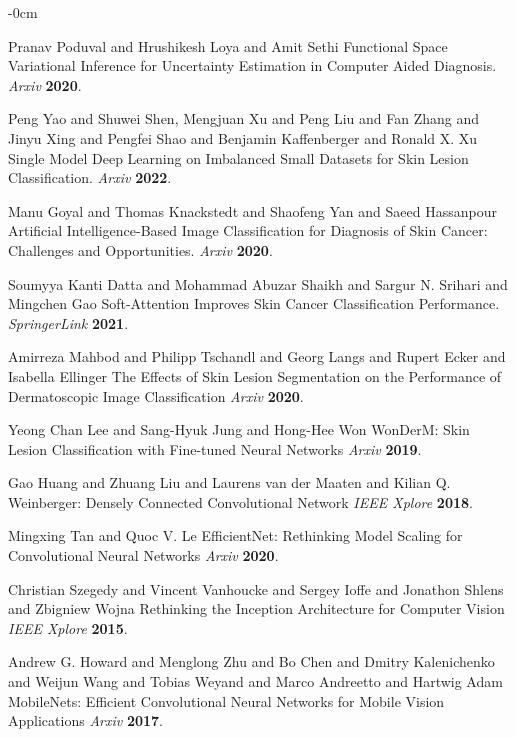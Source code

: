 \documentclass[sensors,article,submit,pdftex,moreauthors]{Definitions/mdpi}
\begin{document}
\begin{adjustwidth}{-\extralength}{0cm}
\begin{thebibliography}{999}
Pranav Poduval and Hrushikesh Loya and Amit Sethi Functional Space Variational Inference for Uncertainty Estimation in Computer Aided Diagnosis. 
{\em Arxiv} 
{\bf 2020}.

Peng Yao and Shuwei Shen, Mengjuan Xu and Peng Liu and Fan Zhang and Jinyu Xing and Pengfei Shao and Benjamin Kaffenberger and Ronald X. Xu Single Model Deep Learning on Imbalanced Small Datasets for Skin Lesion Classification. 
{\em Arxiv} 
{\bf 2022}.

Manu Goyal and Thomas Knackstedt and Shaofeng Yan and Saeed Hassanpour Artificial Intelligence-Based Image Classification for Diagnosis of Skin Cancer: Challenges and Opportunities. 
{\em Arxiv} 
{\bf 2020}.

Soumyya Kanti Datta and  Mohammad Abuzar Shaikh and Sargur N. Srihari and Mingchen Gao Soft-Attention Improves Skin Cancer Classification Performance. {\em SpringerLink} 
{\bf 2021}.

Amirreza Mahbod and Philipp Tschandl and Georg Langs and Rupert Ecker and Isabella Ellinger The Effects of Skin Lesion Segmentation on the Performance of Dermatoscopic Image Classification
{\em Arxiv} 
{\bf 2020}.

Yeong Chan Lee and Sang-Hyuk Jung and Hong-Hee Won WonDerM: Skin Lesion Classification with Fine-tuned Neural Networks
{\em Arxiv} 
{\bf 2019}.

Gao Huang and Zhuang Liu and Laurens van der Maaten and Kilian Q. Weinberger: Densely Connected Convolutional Network
{\em IEEE Xplore} 
{\bf 2018}.

Mingxing Tan and Quoc V. Le EfficientNet: Rethinking Model Scaling for Convolutional Neural Networks
{\em Arxiv} 
{\bf 2020}.

Christian Szegedy and Vincent Vanhoucke and Sergey Ioffe and Jonathon Shlens and Zbigniew Wojna Rethinking the Inception Architecture for Computer Vision
{\em IEEE Xplore} 
{\bf 2015}.

Andrew G. Howard and Menglong Zhu and Bo Chen and Dmitry Kalenichenko and Weijun Wang and Tobias Weyand and Marco Andreetto and Hartwig Adam MobileNets: Efficient Convolutional Neural Networks for Mobile Vision Applications
{\em Arxiv} 
{\bf 2017}.


\end{thebibliography}
\end{adjustwidth}
\end{document}
